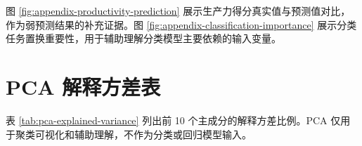 图 \ref{fig:appendix-productivity-prediction} 展示生产力得分真实值与预测值对比，作为弱预测结果的补充证据。图 \ref{fig:appendix-classification-importance} 展示分类任务置换重要性，用于辅助理解分类模型主要依赖的输入变量。



\section{PCA 解释方差表}

表 \ref{tab:pca-explained-variance} 列出前 10 个主成分的解释方差比例。PCA 仅用于聚类可视化和辅助理解，不作为分类或回归模型输入。


